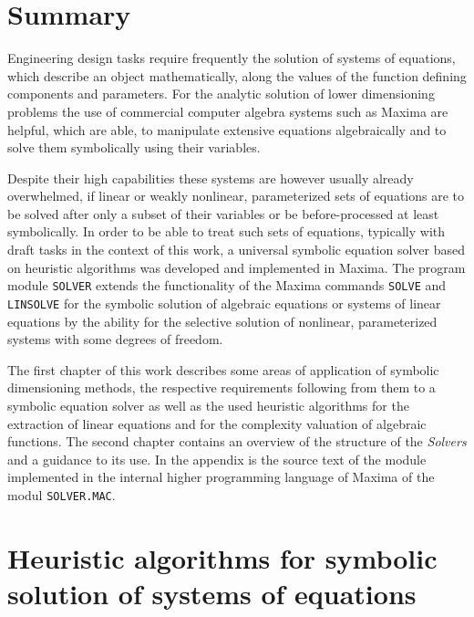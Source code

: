 \documentclass[11pt]{report}           %
\newcounter{problem}
\begin{document}
\cleardoublepage

\chapter*{Summary}
\thispagestyle{empty}

Engineering design tasks  require frequently the solution of systems of equations, which describe an object mathematically, along the values of the function defining components and parameters. For the analytic solution of lower dimensioning problems the use of commercial computer algebra systems such as Maxima are helpful, which are able, to manipulate extensive equations algebraically and to solve them symbolically using their variables.

Despite their high capabilities these systems are however usually already overwhelmed, if linear or weakly nonlinear, parameterized sets of equations are to be solved after only a subset of their variables or be before-processed at least symbolically. In order to be able to treat such sets of equations, typically with draft tasks in the context of this work, a universal symbolic equation solver based on heuristic algorithms was developed and implemented in Maxima. The program module  \verb+SOLVER+ extends the functionality of the Maxima commands \verb+SOLVE+ and  \verb+LINSOLVE+  for the symbolic solution of algebraic equations or  systems of linear equations by the ability for the selective solution of nonlinear, parameterized systems with some degrees of freedom.

The first chapter of this work describes some areas of application of symbolic dimensioning methods, the respective
 requirements following from them to a symbolic equation solver as well as the used heuristic algorithms for the extraction of linear equations and for the complexity valuation of algebraic functions. The second chapter contains an overview of the structure of the {\em Solvers} and a guidance to its use. In the appendix is the source text of the module implemented in the internal higher programming language of Maxima of the modul \verb+SOLVER.MAC+.


\cleardoublepage
\pagestyle{headings}
\tableofcontents

\cleardoublepage

\chapter[Heuristic algorithms]{Heuristic algorithms for
symbolic solution of systems of equations}
%
\end{document}
